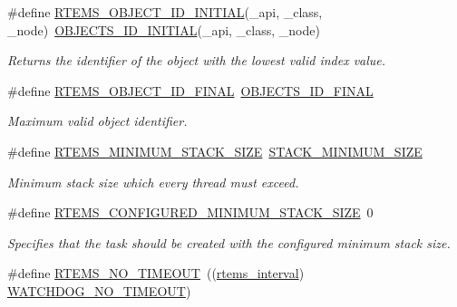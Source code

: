 \begin{DoxyCompactItemize}
\#define \mbox{\hyperlink{group__RTEMSAPIClassic_ga381ee834c91f1ccd830f58a472aeffa6}{R\+T\+E\+M\+S\+\_\+\+O\+B\+J\+E\+C\+T\+\_\+\+I\+D\+\_\+\+I\+N\+I\+T\+I\+AL}}(\+\_\+api,  \+\_\+class,  \+\_\+node)~\mbox{\hyperlink{group__RTEMSScoreObject_ga7ad5e19b6b3d77541c5c272188a71fbe}{O\+B\+J\+E\+C\+T\+S\+\_\+\+I\+D\+\_\+\+I\+N\+I\+T\+I\+AL}}(\+\_\+api, \+\_\+class, \+\_\+node)
\begin{DoxyCompactList}\small\item\em Returns the identifier of the object with the lowest valid index value. \end{DoxyCompactList}\item 
\mbox{\label{group__RTEMSAPIClassic_gad07fa9c00468c89ebe024ce603b65b21}} 
\#define \mbox{\hyperlink{group__RTEMSAPIClassic_gad07fa9c00468c89ebe024ce603b65b21}{R\+T\+E\+M\+S\+\_\+\+O\+B\+J\+E\+C\+T\+\_\+\+I\+D\+\_\+\+F\+I\+N\+AL}}~\mbox{\hyperlink{group__RTEMSScoreObject_ga02561e994044206ad10e7fbfe6a0b0ba}{O\+B\+J\+E\+C\+T\+S\+\_\+\+I\+D\+\_\+\+F\+I\+N\+AL}}
\begin{DoxyCompactList}\small\item\em Maximum valid object identifier. \end{DoxyCompactList}\item 
\#define \mbox{\hyperlink{group__RTEMSAPIClassic_ga2e35188053c5e97a85df8e3aa4d23d2f}{R\+T\+E\+M\+S\+\_\+\+M\+I\+N\+I\+M\+U\+M\+\_\+\+S\+T\+A\+C\+K\+\_\+\+S\+I\+ZE}}~\mbox{\hyperlink{group__RTEMSScoreStack_gaef3654e2c6c9afbd5dbe22b84fc22fc5}{S\+T\+A\+C\+K\+\_\+\+M\+I\+N\+I\+M\+U\+M\+\_\+\+S\+I\+ZE}}
\begin{DoxyCompactList}\small\item\em Minimum stack size which every thread must exceed. \end{DoxyCompactList}\item 
\#define \mbox{\hyperlink{group__RTEMSAPIClassic_gaf0e9e3aff09f933ed7dbbbfd2c55f0f2}{R\+T\+E\+M\+S\+\_\+\+C\+O\+N\+F\+I\+G\+U\+R\+E\+D\+\_\+\+M\+I\+N\+I\+M\+U\+M\+\_\+\+S\+T\+A\+C\+K\+\_\+\+S\+I\+ZE}}~0
\begin{DoxyCompactList}\small\item\em Specifies that the task should be created with the configured minimum stack size. \end{DoxyCompactList}\item 
\#define \mbox{\hyperlink{group__RTEMSAPIClassic_ga4b2775cd075d4046bf637ae802689476}{R\+T\+E\+M\+S\+\_\+\+N\+O\+\_\+\+T\+I\+M\+E\+O\+UT}}~((\mbox{\hyperlink{group__ClassicTasks_gad39c43f949683d46874e3a5586b93aee}{rtems\+\_\+interval}}) \mbox{\hyperlink{group__RTEMSScoreWatchdog_gaa7a11d3dcb3ba512032421888d16b327}{W\+A\+T\+C\+H\+D\+O\+G\+\_\+\+N\+O\+\_\+\+T\+I\+M\+E\+O\+UT}})

\end{DoxyCompactItemize}
